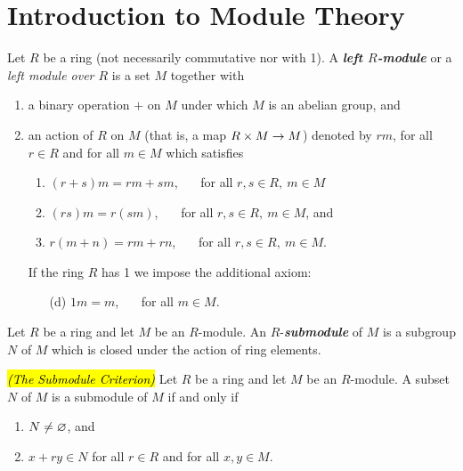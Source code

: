 \section{Introduction to Module Theory}
\setcounter{thm}{0}

\begin{defn}
Let $R$ be a ring (not necessarily commutative nor with 1). A \textit{\textbf{left $R$-module}} or a \textit{left module over $R$} is a set $M$ together with
\begin{enumerate}
\item a binary operation $+$ on $M$ under which $M$ is an abelian group, and
\item an action of $R$ on $M$ (that is, a map $R\times M\rightarrow M$) denoted by $rm$, for all $r\in R$ and for all $m\in M$ which satisfies
\begin{enumerate}
\item $(r + s)m = rm + sm$, \ \ \ for all $r,s\in R,\ m\in M$
\item $(rs)m = r(sm)$, \ \ \ for all $r,s\in R,\ m\in M$, and 
\item $r(m + n) = rm + rn$, \ \ \ for all $r,s\in R,\ m\in M$.
\end{enumerate}
If the ring $R$ has 1 we impose the additional axiom:
\begin{enumerate}
\item[(d)]  $1m = m$, \ \ \ for all $m\in M$.
\end{enumerate}
\end{enumerate}
\end{defn}

\nl

\begin{defn}
Let $R$ be a ring and let $M$ be an $R$-module. An $R$-\textit{\textbf{submodule}} of $M$ is a subgroup $N$ of $M$ which is closed under the action of ring elements. 
\end{defn}

\nl

\begin{prop}
\hl{\textit{(The Submodule Criterion)}} Let $R$ be a ring and let $M$ be an $R$-module. A subset $N$ of $M$ is a submodule of $M$ if and only if
\begin{enumerate}
\item $N\neq \varnothing$, and
\item $x + ry\in N$ for all $r\in R$ and for all $x,y\in M$.
\end{enumerate}
\end{prop}

